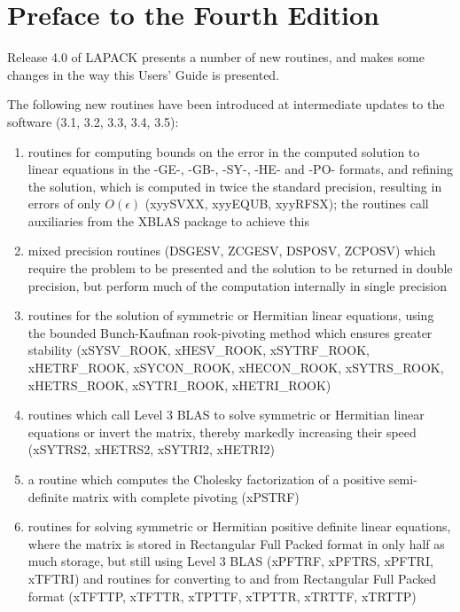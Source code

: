 \chapter*{Preface to the Fourth Edition}

Release 4.0 of LAPACK presents a number of new routines, and makes some changes
in the way this Users' Guide is presented.

The following new routines have been introduced at intermediate updates to the software
(3.1, 3.2, 3.3, 3.4, 3.5):

\begin{enumerate}

\item routines for computing bounds on the error in the computed solution
to linear equations in the -GE-, -GB-, -SY-, -HE- and -PO- formats,
and refining the solution,
which is computed in twice the standard precision, resulting in errors of  only $O(\epsilon)$
(xyySVXX, xyyEQUB, xyyRFSX);
the routines call auxiliaries from the XBLAS package to achieve this

\item mixed precision routines (DSGESV, ZCGESV, DSPOSV, ZCPOSV) 
which require the problem to be presented and the solution to be returned in double precision,
but perform much of the computation internally in single precision

\item routines for the solution of symmetric or Hermitian linear equations,
using the bounded Bunch-Kaufman rook-pivoting method
which ensures greater stability
(\mbox{xSYSV\_ROOK}, \linebreak
 \mbox{xHESV\_ROOK}, 
 \mbox{xSYTRF\_ROOK}, 
 \mbox{xHETRF\_ROOK},
 \mbox{xSYCON\_ROOK}, 
 \mbox{xHECON\_ROOK}, \linebreak
 \mbox{xSYTRS\_ROOK}, 
 \mbox{xHETRS\_ROOK},
 \mbox{xSYTRI\_ROOK}, 
 \mbox{xHETRI\_ROOK})

\item routines which call Level 3 BLAS to solve symmetric or Hermitian linear equations
 or invert the matrix, thereby markedly increasing their speed
(xSYTRS2, xHETRS2, xSYTRI2, xHETRI2)

\item a routine which computes the Cholesky factorization
of a positive semi-definite matrix with complete pivoting
(xPSTRF)

\item routines for solving symmetric or Hermitian positive definite linear equations,
where the matrix is stored in Rectangular Full Packed format
in only half as much storage, but still using Level 3 BLAS
(xPFTRF, xPFTRS, xPFTRI, xTFTRI)
and routines for converting to and from Rectangular Full Packed format
(xTFTTP, xTFTTR, xTPTTF, xTPTTR, xTRTTF, xTRTTP)


\end{enumerate}
